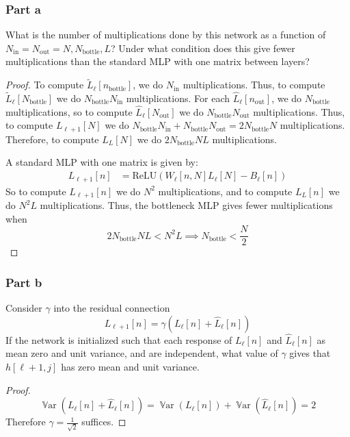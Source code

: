 \documentclass{amsart}
\DeclareMathOperator{\Var}{\mathbb{V}ar}  %
\theoremstyle{definition}
\begin{document}
\subsubsection*{Part a} What is the number of multiplications done by this network as a function of $N_{\text{in}} = N_{\text{out}} = N, N_{\text{bottle}}, L$?
Under what condition does this give fewer multiplications than the standard MLP with one matrix between layers?
\begin{proof}
  To compute $\tilde{L}_\ell[n_{\text{bottle}}]$, we do $N_{\text{in}}$ multiplications. 
  Thus, to compute $\tilde{L}_\ell[N_{\text{bottle}}]$ we do $N_{\text{bottle}} N_{\text{in}}$ multiplications.
  For each $\hat{L}_\ell[n_{\text{out}}]$, we do $N_{\text{bottle}}$ multiplications, so to compute $\hat{L}_\ell[N_{\text{out}}]$ we do $N_{\text{bottle}} N_{\text{out}}$ multiplications.
  Thus, to compute $L_{\ell + 1}[N]$ we do $N_{\text{bottle}} N_{\text{in}} + N_{\text{bottle}} N_{\text{out}} = 2 N_{\text{bottle}} N$ multiplications.
  Therefore, to compute $L_{L}[N]$ we do $2 N_{\text{bottle}} N L$ multiplications.

  A standard MLP with one matrix is given by:
  \begin{align*}
    L_{\ell + 1}[n] &= \mathrm{ReLU}(W_\ell[n, N] L_\ell[N] - B_\ell[n]) 
  \end{align*}
  So to compute $L_{\ell + 1}[n]$ we do $N^2$ multiplications, and to compute $L_L[n]$ we do $N^2 L$ multiplications.
  Thus, the bottleneck MLP gives fewer multiplications when 
  \[
  2 N_{\text{bottle}} N L < N^2 L \implies N_{\text{bottle}} < \frac{N}{2}
  \]
\end{proof}

\subsubsection*{Part b} Consider $\gamma$ into the residual connection
\[
L_{\ell + 1}[n] = \gamma(L_{\ell}[n] + \hat{L}_{\ell}[n])
\]
If the network is initialized such that each response of $L_{\ell}[n]$ and $\hat{L}_{\ell}[n]$ as mean zero and unit variance, and are independent, what value of $\gamma$ gives that $h[\ell + 1, j]$ has zero mean and unit variance. 

\begin{proof}
  \[
  \Var(L_{\ell}[n] + \hat{L}_{\ell}[n]) = \Var(L_{\ell}[n]) + \Var(\hat{L}_\ell[n]) = 2
  \]
  Therefore $\gamma = \frac1{\sqrt{2}}$ suffices. 
\end{proof}
\end{document}
